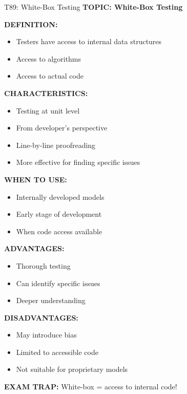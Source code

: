 \documentclass[8pt]{beamer}
\begin{document}
	\begin{frame}{T89: White-Box Testing}
		\fontsize{6.5}{7.5}\selectfont
		\textbf{TOPIC: White-Box Testing}
		
		\vspace{0.1cm}
		\textbf{DEFINITION:}
		\begin{itemize}
			\item Testers have access to internal data structures
			\item Access to algorithms
			\item Access to actual code
		\end{itemize}
		
		\vspace{0.1cm}
		\textbf{CHARACTERISTICS:}
		\begin{itemize}
			\item Testing at unit level
			\item From developer's perspective
			\item Line-by-line proofreading
			\item More effective for finding specific issues
		\end{itemize}
		
		\vspace{0.1cm}
		\textbf{WHEN TO USE:}
		\begin{itemize}
			\item Internally developed models
			\item Early stage of development
			\item When code access available
		\end{itemize}
		
		\vspace{0.1cm}
		\textbf{ADVANTAGES:}
		\begin{itemize}
			\item Thorough testing
			\item Can identify specific issues
			\item Deeper understanding
		\end{itemize}
		
		\vspace{0.1cm}
		\textbf{DISADVANTAGES:}
		\begin{itemize}
			\item May introduce bias
			\item Limited to accessible code
			\item Not suitable for proprietary models
		\end{itemize}
		
		\textcolor{myred}{\textbf{EXAM TRAP:}} White-box = \textcolor{myblue}{access to internal code}!
	\end{frame}
	
\end{document}
